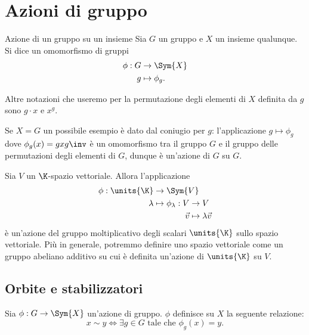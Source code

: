 \section{Azioni di gruppo}

\begin{definition}
    {Azione di un gruppo su un insieme}{} Sia $G$ un gruppo e $X$ un insieme qualunque. Si dice  un omomorfismo di gruppi \begin{align*}
        \phi : G &\to \Sym{X}\\
        g &\mapsto \phi_g.
    \end{align*}
\end{definition}

Altre notazioni che useremo per la permutazione degli elementi di $X$ definita da $g$ sono $g \cdot x$ e $x^g$.

\begin{example}
    Se $X = G$ un possibile esempio è dato dal coniugio per $g$: l'applicazione $g \mapsto \phi_g$ dove $\phi_g(x) = gxg\inv$ è un omomorfismo tra il gruppo $G$ e il gruppo delle permutazioni degli elementi di $G$, dunque è un'azione di $G$ su $G$.
\end{example}
\begin{example}
    Sia $V$ un $\K$-spazio vettoriale. Allora l'applicazione \begin{align*}
        \phi : \units{\K} &\to \Sym{V}\\
        \lambda &\mapsto \begin{aligned}[t]
            \phi_\lambda : V &\to V\\
            \vec v &\mapsto \lambda\vec v
        \end{aligned}
    \end{align*} è un'azione del gruppo moltiplicativo degli scalari $\units{\K}$ sullo spazio vettoriale. Più in generale, potremmo definire uno spazio vettoriale come un gruppo abeliano additivo su cui è definita un'azione di $\units{\K}$ su $V$.
\end{example}

\subsection{Orbite e stabilizzatori}

Sia $\phi : G \to \Sym{X}$ un'azione di gruppo. $\phi$ definisce su $X$ la seguente relazione: \begin{equation}\label{eq:eq_rel_group_action}
    x \sim y \iff \exists g \in G \text{ tale che } \phi_g(x) = y.    
\end{equation}

